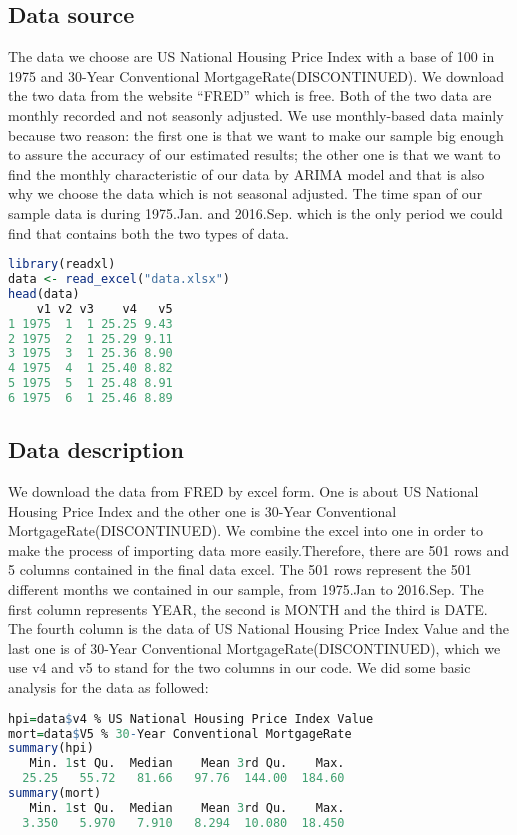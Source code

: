 \documentclass[12pt,letterpaper]{article}
\begin{document}
\subsection{Data source}
The data we choose are US National Housing Price Index with a base of 100 in 1975 and 30-Year Conventional MortgageRate(DISCONTINUED). 
We download the two data from the website ``FRED'' which is free. 
Both of the two data are monthly recorded and not seasonly adjusted. 
We use monthly-based data mainly because two reason: the first one is that we want to make our sample big enough to assure the accuracy of our estimated results; the other one is that we  want to find the monthly characteristic of our data by ARIMA model and that is also why we choose the data which is not seasonal adjusted.
The time span of our sample data is during 1975.Jan. and 2016.Sep. which is the only period we could find that contains both the two types of data.

{\footnotesize
\begin{lstlisting}[language=R]
library(readxl)
data <- read_excel("data.xlsx")
head(data)
    v1 v2 v3    v4   v5
1 1975  1  1 25.25 9.43
2 1975  2  1 25.29 9.11
3 1975  3  1 25.36 8.90
4 1975  4  1 25.40 8.82
5 1975  5  1 25.48 8.91
6 1975  6  1 25.46 8.89
\end{lstlisting}
}

\subsection{Data description}
We download the data from FRED by excel form. One is about US National Housing Price Index and the other one is 30-Year Conventional MortgageRate(DISCONTINUED).
We combine the excel into one in order to make the process of importing data more easily.Therefore, there are 501 rows and 5 columns contained in the final data excel.
The 501 rows represent the 501 different months we contained in our sample, from 1975.Jan to 2016.Sep.
The first column represents YEAR, the second is MONTH and the third is DATE.
The fourth column is the data of US National Housing Price Index Value and the last one is of 30-Year Conventional MortgageRate(DISCONTINUED), which we use v4 and v5 to stand for the two columns in our code.
We did some basic analysis for the data as followed:

{\footnotesize
\begin{lstlisting}[language=R]
hpi=data$v4 % US National Housing Price Index Value
mort=data$V5 % 30-Year Conventional MortgageRate
summary(hpi)
   Min. 1st Qu.  Median    Mean 3rd Qu.    Max. 
  25.25   55.72   81.66   97.76  144.00  184.60 
summary(mort)
   Min. 1st Qu.  Median    Mean 3rd Qu.    Max. 
  3.350   5.970   7.910   8.294  10.080  18.450
\end{lstlisting}
}
         
\end{document}
